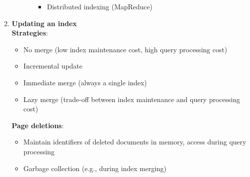\begin{enumerate}
\begin{itemize}
\begin{enumerate}
\begin{itemize}
                \item Distributed indexing (MapReduce)
            \end{itemize}
        \end{enumerate}
    \end{itemize}
    \item \textbf{Updating an index} \\
    \textbf{Strategies}:
    \begin{itemize}
        \item No merge (low index maintenance cost, high query processing cost)
        \item Incremental update 
        \item Immediate merge (always a single index)
        \item Lazy merge (trade-off between index maintenance and query processing cost)
    \end{itemize}
    \textbf{Page deletions}:
    \begin{itemize}
        \item Maintain identifiers of deleted documents in memory, access during query processing
        \item Garbage collection (e.g., during index merging)
    \end{itemize}
\end{enumerate}
\newpage